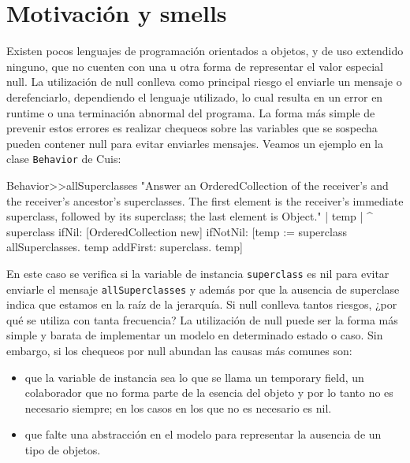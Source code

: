 \section{Motivación y smells}

Existen pocos lenguajes de programación orientados a objetos, y de uso extendido ninguno, que no
cuenten con una u otra forma de representar el valor especial null. La utilización de null conlleva
como principal riesgo el enviarle un mensaje o derefenciarlo, dependiendo el lenguaje utilizado, lo
cual resulta en un error en runtime o una terminación abnormal del programa. La forma más simple de
prevenir estos errores es realizar chequeos sobre las variables que se sospecha pueden contener null
para evitar enviarles mensajes. Veamos un ejemplo en la clase \lstinline{Behavior} de Cuis:

\begin{code}
Behavior>>allSuperclasses
	"Answer an OrderedCollection of the receiver's and the receiver's  
	ancestor's superclasses. The first element is the receiver's immediate  
	superclass, followed by its superclass; the last element is Object."
	| temp |
	^ superclass
		ifNil: [OrderedCollection new]
		ifNotNil: [temp := superclass allSuperclasses.
			temp addFirst: superclass.
            temp]
\end{code}

En este caso se verifica si la variable de instancia \lstinline{superclass} es nil para evitar
enviarle el mensaje \lstinline{allSuperclasses} y además por que la ausencia de superclase indica
que estamos en la raíz de la jerarquía.
Si null conlleva tantos riesgos, ¿por qué se utiliza con tanta frecuencia? La utilización de null
puede ser la forma más simple y barata de implementar un modelo en determinado estado o caso. Sin
embargo, si los chequeos por null abundan las causas más comunes son:

\begin{itemize}
    \item que la variable de instancia sea lo que se llama un temporary field, un colaborador que no
      forma parte de la esencia del objeto y por lo tanto no es necesario siempre; en los casos en los
      que no es necesario es nil.
    \item que falte una abstracción en el modelo para representar la ausencia de un tipo de objetos.
\end{itemize}

